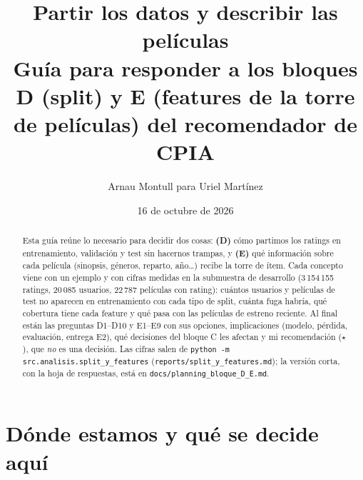 \documentclass[a4paper,11pt]{article}
\title{\textbf{Partir los datos y describir las películas}\\[4pt]
\large Guía para responder a los bloques D (split) y E (features de la torre de películas) del recomendador de CPIA}
\author{Arnau Montull \quad para \quad Uriel Martínez}
\date{16 de octubre de 2026}
\newcommand{\rec}{\ensuremath{\star}}
\begin{document}
\maketitle

\begin{abstract}
\noindent Esta guía reúne lo necesario para decidir dos cosas: \textbf{(D)} cómo partimos los ratings en entrenamiento,
validación y test sin hacernos trampas, y \textbf{(E)} qué información sobre cada película (sinopsis, géneros, reparto,
año\dots) recibe la torre de ítem. Cada concepto viene con un ejemplo y con cifras medidas en la submuestra de desarrollo
(3\,154\,155 ratings, 20\,085 usuarios, 22\,787 películas con rating): cuántos usuarios y películas de test no aparecen en
entrenamiento con cada tipo de split, cuánta fuga habría, qué cobertura tiene cada feature y qué pasa con las películas
de estreno reciente. Al final están las preguntas D1--D10 y E1--E9 con sus opciones, implicaciones (modelo, pérdida,
evaluación, entrega E2), qué decisiones del bloque C les afectan y mi recomendación (\rec), que \emph{no} es una decisión.
Las cifras salen de \texttt{python -m src.analisis.split\_y\_features} (\texttt{reports/split\_y\_features.md}); la versión
corta, con la hoja de respuestas, está en \texttt{docs/planning\_bloque\_D\_E.md}.
\end{abstract}

\tableofcontents
\newpage

\section{Dónde estamos y qué se decide aquí}
\end{document}
